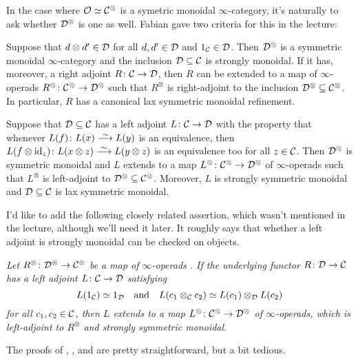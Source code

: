 In the case where $\mathcal{O}\simeq \mathcal{C}^\otimes$ is a symetric monoidal $\infty$-category, it's naturally to ask whether $\mathcal{D}^\otimes$ is one as well. Fabian gave two criteria for this in the lecture:
\begin{alphanumerate}\itshape 
	\item Suppose that $d\otimes d'\in \mathcal{D}$ for all $d,d'\in \mathcal{D}$ and $1_{\mathcal{C}}\in \mathcal{D}$. Then $\mathcal{D}^\otimes$ is a symmetric monoidal $\infty$-category and the inclusion $\mathcal{D}\subseteq \mathcal{C}$ is strongly monoidal. If it has, moreover, a right adjoint $R\colon \Cc\morphism\Dd$, then $R$ can be extended to a map of $\infty$-operads $R^\otimes\colon \Cc^\otimes\morphism\Dd^\otimes$ such that $R^\otimes$ is right-adjoint to the inclusion $\mathcal{D}^\otimes\subseteq \mathcal{C}^\otimes$. In particular, $R$ has a canonical lax symmetric monoidal refinement.
	\item Suppose that $\mathcal{D}\subseteq \mathcal{C}$ has a left adjoint $L\colon \Cc\morphism\Dd$ with the property that whenever $L(f)\colon L(x)\isomorphism L(y)$ is an equivalence, then $L(f\otimes \id_z)\colon L(x\otimes z)\isomorphism L(y\otimes z)$ is an equivalence too for all $z\in\mathcal{C}$. Then $\mathcal{D}^\otimes$ is symmetric monoidal and $L$ extends to a map $L^\otimes\colon \Cc^\otimes\morphism\Dd^\otimes$ of $\infty$-operads such that $L^\otimes$ is left-adjoint to $\mathcal{D}^\otimes\subseteq \mathcal{C}^\otimes$. Moreover, $L$ is strongly symmetric monoidal and $\mathcal{D}\subseteq \mathcal{C}$ is lax symmetric monoidal.
\end{alphanumerate}
I'd like to add the following closely related assertion, which wasn't mentioned in the lecture, although we'll need it later. It roughly says that whether a left adjoint is strongly monoidal can be checked on objects.
\begin{alphanumerate}
	\item[\itememph{c^*}]\itshape Let $R^\otimes\colon \Dd^\otimes\morphism\Cc^\otimes$ be a map of $\infty$-operads . If the underlying functor $R\colon \Dd\morphism\Cc$ has a left adjoint $L\colon \Cc\morphism\Dd$ satisfying
	\begin{equation*}
		L(1_{\mathcal{C}})\simeq 1_{\mathcal{D}}\quad\text{and}\quad L(c_1\otimes_{\mathcal{C}} c_2)\simeq L(c_1)\otimes_{\mathcal{D}} L(c_2)
	\end{equation*}
	for all $c_1,c_2\in \mathcal{C}$, then $L$ extends to a map $L^\otimes\colon \Cc^\otimes\morphism \Dd^\otimes$ of $\infty$-operads, which is left-adjoint to $R^\otimes$ and strongly symmetric monoidal.
\end{alphanumerate}
The proofs of , , and  are pretty straightforward, but a bit tedious.
